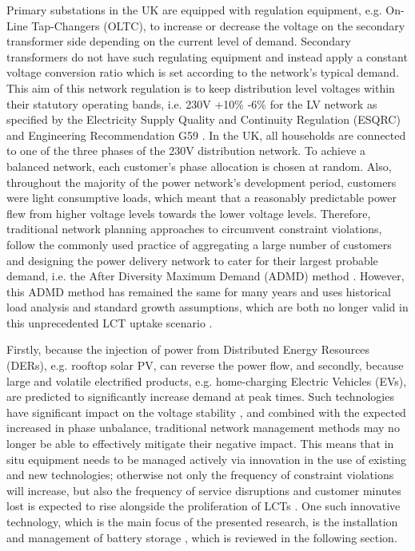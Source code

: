 
Primary substations in the UK are equipped with regulation equipment, e.g. On-Line Tap-Changers (OLTC), to increase or decrease the voltage on the secondary transformer side depending on the current level of demand.
Secondary transformers do not have such regulating equipment and instead apply a constant voltage conversion ratio which is set according to the network's typical demand.
This aim of this network regulation is to keep distribution level voltages within their statutory operating bands, i.e. 230V +10\% -6\% for the LV network as specified by the Electricity Supply Quality and Continuity Regulation (ESQRC) \cite{HealthandSafetyExecutive2002} and Engineering Recommendation G59 \cite{EnergyNetworksAssociation2013}.
In the UK, all households are connected to one of the three phases of the 230V distribution network.
To achieve a balanced network, each customer's phase allocation is chosen at random.
Also, throughout the majority of the power network's development period, customers were light consumptive loads, which meant that a reasonably predictable power flew from higher voltage levels towards the lower voltage levels.
Therefore, traditional network planning approaches to circumvent constraint violations, follow the commonly used practice of aggregating a large number of customers and designing the power delivery network to cater for their largest probable demand, i.e. the After Diversity Maximum Demand (ADMD) method \cite{Richardson2010a}.
However, this ADMD method has remained the same for many years and uses historical load analysis and standard growth assumptions, which are both no longer valid in this unprecedented LCT uptake scenario \cite{Yunusov2016}.

Firstly, because the injection of power from Distributed Energy Resources (DERs), e.g. rooftop solar PV, can reverse the power flow, and secondly, because large and volatile electrified products, e.g. home-charging Electric Vehicles (EVs), are predicted to significantly increase demand at peak times.
Such technologies have significant impact on the voltage stability \cite{Petinrin2016}, and combined with the expected increased in phase unbalance, traditional network management methods may no longer be able to effectively mitigate their negative impact.
This means that in situ equipment needs to be managed actively via innovation in the use of existing and new technologies; otherwise not only the frequency of constraint violations will increase, but also the frequency of service disruptions and customer minutes lost is expected to rise alongside the proliferation of LCTs \cite{Ault2008a}.
One such innovative technology, which is the main focus of the presented research, is the installation and management of battery storage \cite{Chen2009}, which is reviewed in the following section.


